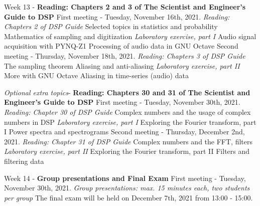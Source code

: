 \documentclass[10pt]{article}
\begin{document}
\begin{outline}[enumerate]
\1 Week 13 - \textbf{Reading: Chapters 2 and 3 of The Scientist and Engineer's Guide to DSP}
\2 First meeting - Tuesday, November 16th, 2021. \textit{Reading: Chapters 2 of DSP Guide}
\3 Selected topics in statistics and probability
\3 Mathematics of sampling and digitization
\3 \textit{Laboratory exercise, part I}
\4 Audio signal acquisition with PYNQ-Z1
\4 Processing of audio data in GNU Octave
\2 Second meeting - Thursday, November 18th, 2021. \textit{Reading: Chapters 3 of DSP Guide}
\3 The sampling theorem
\3 Aliasing and anti-aliasing
\3 \textit{Laboratory exercise, part II}
\4 More with GNU Octave
\4 Aliasing in time-series (audio) data

\1 \textit{Optional extra topics}- \textbf{Reading: Chapters 30 and 31 of The Scientist and Engineer's Guide to DSP}
\2 First meeting - Tuesday, November 30th, 2021. \textit{Reading: Chapter 30 of DSP Guide}
\3 Complex numbers and the usage of complex numbers in DSP
\3 \textit{Laboratory exercise, part I}
\4 Exploring the Fourier transform, part I
\4 Power spectra and spectrograms
\2 Second meeting - Thursday, December 2nd, 2021. \textit{Reading: Chapter 31 of DSP Guide}
\3 Complex numbers and the FFT, filters
\3 \textit{Laboratory exercise, part II}
\4 Exploring the Fourier transform, part II
\4 Filters and filtering data

\1 Week 14 - \textbf{Group presentations and Final Exam}
\2 First meeting - Tuesday, November 30th, 2021.
\3 \textit{Group presentations: max. 15 minutes each, two students per group}
\2 The final exam will be held on December 7th, 2021 from 13:00 - 15:00.
\end{outline}
\end{document}
